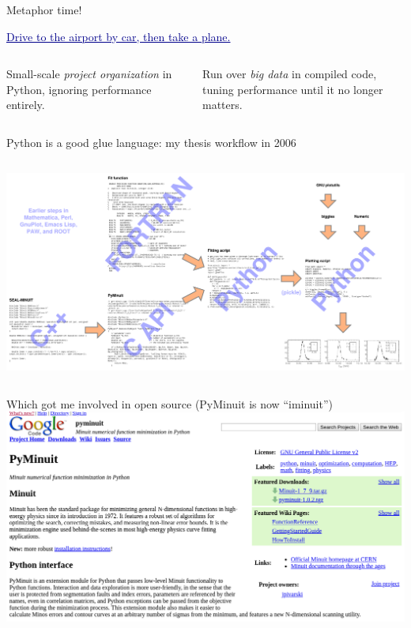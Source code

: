 \documentclass[aspectratio=169]{beamer}
\begin{document}
\begin{frame}{Metaphor time!}
\Large
\vspace{0.25 cm}
\begin{center}
\textcolor{darkblue}{\underline{Drive to the airport by car, then take a plane.}}
\end{center}

\vspace{0.5 cm}
\begin{columns}
\begin{center}
Small-scale {\it project organization} in Python, ignoring performance entirely.
\end{center}

\begin{center}
Run over {\it big data} in compiled code, tuning performance until it no longer matters.
\end{center}

\end{columns}
\end{frame}

\begin{frame}{Python is a good glue language: my thesis workflow in 2006}
\vspace{0.5 cm}
\begin{columns}
\includegraphics[width=\linewidth]{thesis-code-flow.pdf}
\end{columns}
\end{frame}

\begin{frame}{Which got me involved in open source (PyMinuit is now ``iminuit'')}
\vspace{0.5 cm}
\includegraphics[width=\linewidth]{pyminuit.png}
\end{frame}
\end{document}
